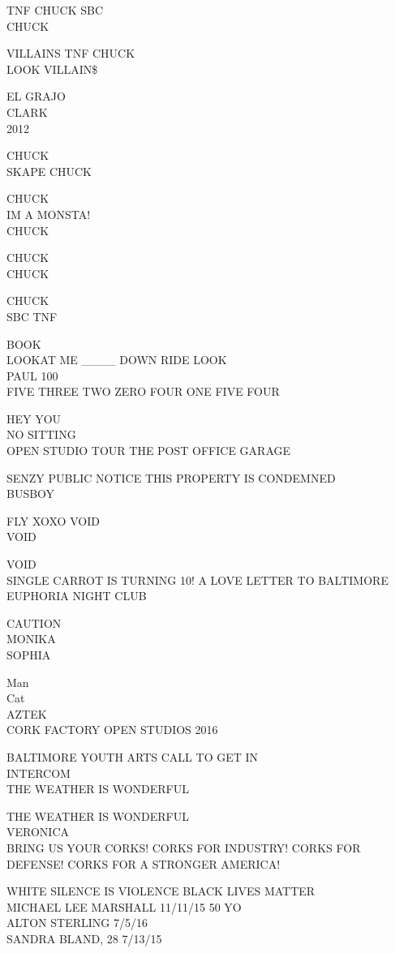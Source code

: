 \documentclass[10pt,letterpaper]{article}
\begin{document}
TNF CHUCK SBC\\
CHUCK

VILLAINS TNF CHUCK\\
LOOK VILLAIN\$

EL GRAJO\\
CLARK\\
2012

CHUCK\\
SKAPE CHUCK

CHUCK\\
IM A MONSTA!\\
CHUCK

CHUCK\\
CHUCK

CHUCK\\
SBC TNF

BOOK\\
LOOKAT ME \_\_\_\_ DOWN RIDE LOOK\\
PAUL 100\\
FIVE THREE TWO ZERO FOUR ONE FIVE FOUR

HEY YOU\\
NO SITTING\\
OPEN STUDIO TOUR THE POST OFFICE GARAGE

SENZY PUBLIC NOTICE THIS PROPERTY IS CONDEMNED\\
BUSBOY

FLY XOXO VOID\\
VOID

VOID\\
SINGLE CARROT IS TURNING 10! A LOVE LETTER TO BALTIMORE\\
EUPHORIA NIGHT CLUB

CAUTION\\
MONIKA\\
SOPHIA

Man\\
Cat\\
AZTEK\\
CORK FACTORY OPEN STUDIOS 2016

BALTIMORE YOUTH ARTS CALL TO GET IN\\
INTERCOM\\
THE WEATHER IS WONDERFUL

THE WEATHER IS WONDERFUL\\
VERONICA\\
BRING US YOUR CORKS!  CORKS FOR INDUSTRY!  CORKS FOR DEFENSE!  CORKS FOR A STRONGER AMERICA!

WHITE SILENCE IS VIOLENCE BLACK LIVES MATTER\\
MICHAEL LEE MARSHALL 11/11/15 50 YO\\
ALTON STERLING 7/5/16\\
SANDRA BLAND, 28 7/13/15
\end{document}
